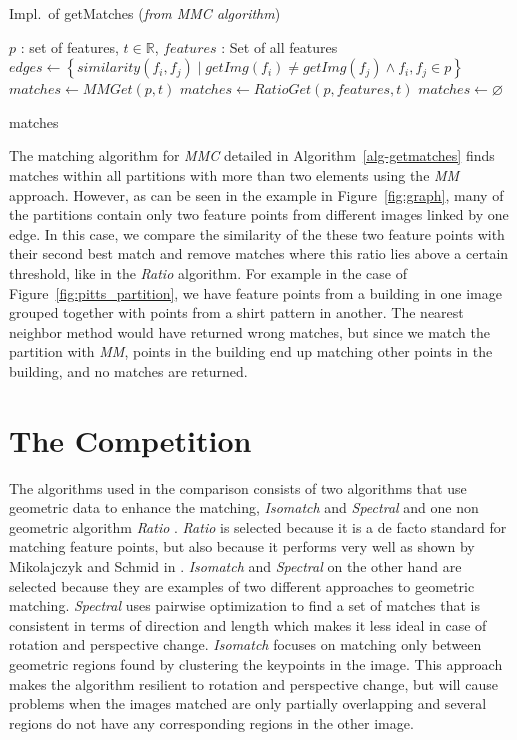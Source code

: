 \begin{algorithm}[htb]
\caption{Impl.\ of getMatches (\emph{from MMC algorithm})}
\label{alg-getmatches}
    \fontsize{10}{10}\selectfont
    \begin{algorithmic}
    \Require $p$ : set of features, $t\in \mathbb{R}$, $features$ : Set of 
    all features
    \State $edges \gets \left\{similarity(f_i, f_j) \mid getImg(f_i)
        \neq getImg(f_j) \wedge f_i, f_j \in p \right\}$
        \State $matches \gets MMGet(p, t)$
        \State $matches \gets RatioGet(p, features, t)$
    \Else
        \State $matches \gets \varnothing$
    \EndIf

    \Return matches
    \end{algorithmic}
\end{algorithm}

The matching algorithm for \emph{MMC} detailed in 
Algorithm~\ref{alg-getmatches} finds matches within all partitions with 
more than two elements using the \emph{MM} approach.  However, as can be 
seen in the example in Figure~\ref{fig:graph}, many of the partitions 
contain only two feature points from different images linked by one 
edge. In this case, we compare the similarity of the these two feature 
points with their second best match and remove matches where this ratio 
lies above a certain threshold, like in the \emph{Ratio} algorithm.  For 
example in the case of Figure~\ref{fig:pitts_partition}, we have feature 
points from a building in one image grouped together with points from a 
shirt pattern in another.  The nearest neighbor method would have 
returned wrong matches, but since we match the partition with \emph{MM}, 
points in the building end up matching other points in the building, and 
no matches are returned.

\section{The Competition}

The algorithms used in the comparison consists of two algorithms that 
use geometric data to enhance the matching, \emph{Isomatch} 
\cite{das2008event} and \emph{Spectral} \cite{leordeanu2005spectral} and 
one non geometric algorithm \emph{Ratio} \cite{lowe2004sift}.  
\emph{Ratio} is selected because it is a de facto standard for matching 
feature points, but also because it performs very well as shown by 
Mikolajczyk and Schmid in \cite{mikolajczyk2005performance}.  
\emph{Isomatch} and \emph{Spectral} on the other hand are selected 
because they are examples of two different approaches to geometric 
matching. \emph{Spectral} uses pairwise optimization to find a set of 
matches that is consistent in terms of direction and length which makes 
it less ideal in case of rotation and perspective change. 
\emph{Isomatch} focuses on matching only between geometric regions found 
by clustering the keypoints in the image.  This approach makes the 
algorithm resilient to rotation and perspective change, but will cause 
problems when the images matched are only partially overlapping and 
several regions do not have any corresponding regions in the other 
image.


